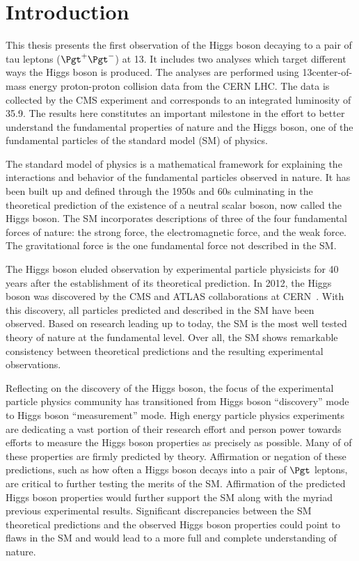 \chapter{Introduction}
\label{sec:introduction}

This thesis presents the first observation of the Higgs boson decaying to a pair
of tau leptons ($\Pgt^{+}\Pgt^{-}$) at 13\TeV. It includes two analyses which target different
ways the Higgs boson is produced. The analyses are performed using
13\TeV center-of-mass energy proton-proton collision data from the CERN LHC.
The data is collected by the CMS experiment and corresponds to an integrated
luminosity of 35.9\fbinv. The results here constitutes an important
milestone in the effort to better understand the fundamental properties of nature and
the Higgs boson, one of the fundamental particles of the standard model (SM) of physics.

The standard model of physics is a mathematical framework for explaining
the interactions and behavior of the fundamental particles observed in nature.
It has been built up and defined through the 1950s and 60s culminating in the
theoretical prediction of the existence of a neutral scalar boson, now called the
Higgs boson.
The SM incorporates descriptions of three of the four fundamental forces of nature:
the strong force, the electromagnetic force, and the weak force.
The gravitational force is the one fundamental force not described in the SM. 

The Higgs boson eluded observation by experimental particle physicists
for 40 years after the establishment of its theoretical prediction. 
In 2012, the Higgs boson was discovered 
by the CMS and ATLAS collaborations at CERN~\cite{Aad:2012tfa, Chatrchyan:2012xdj, Chatrchyan:2013lba}.
With this discovery, all particles predicted and described in the SM have been observed.
Based on research leading up to today, the SM is the most well tested theory of nature at the fundamental level.
Over all, the SM shows remarkable consistency between theoretical predictions and
the resulting experimental observations.

Reflecting on the discovery of the Higgs boson, the focus of the experimental particle physics community has transitioned from
Higgs boson ``discovery'' mode to Higgs boson ``measurement'' mode. High energy particle physics experiments
are dedicating a vast portion of their research effort and person power towards
efforts to measure the Higgs boson properties as precisely as possible. Many 
of of these properties are firmly predicted by theory. Affirmation or negation of these predictions,
such as how often a Higgs boson decays into a pair of $\Pgt$ leptons,
are critical to further testing the merits of the SM. Affirmation of the
predicted Higgs boson properties would further support the SM along with the myriad previous
experimental results. Significant discrepancies between the SM
theoretical predictions and the observed Higgs boson properties could point to
flaws in the SM and would lead to a more full and complete understanding of nature.

